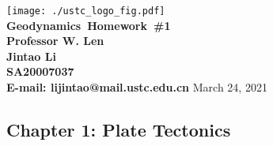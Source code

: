\documentclass{article}
\makeatletter
\newcommand{\hmwkTitle}{Homework\ \#1}
\newcommand{\hmwkClass}{Geodynamics}
\newcommand{\hmwkClassInstructor}{Professor W. Len}
\newcommand{\hmwkAuthorName}{\textbf{Jintao Li}}
\newcommand{\hmwkAuthorID}{\textbf{SA20007037}}
\newcommand{\hmwkAuthoremail}{\textbf{E-mail: lijintao@mail.ustc.edu.cn}}
\makeatother
\begin{document}
\begin{titlepage}

\begin{center}

\textcolor{ustcblue}{\texttt{[image: ./ustc\_logo\_fig.pdf]} \\ [1cm]}
{ \Huge \bfseries \hmwkClass\ \hmwkTitle}\\[1cm]

\large \textbf{\hmwkClassInstructor} \\ [5cm]

\large \hmwkAuthorName \\ [0.25cm]
\large \hmwkAuthorID \\ [0.25cm]
\large \hmwkAuthoremail
\vfill
{\large March 24, 2021}

\end{center}

\end{titlepage}

\begin{center}
\section{Chapter 1: Plate Tectonics}
\end{center}
\end{document}
